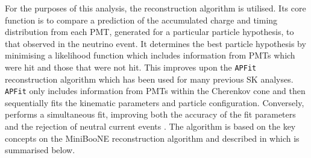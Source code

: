 For the purposes of this analysis, the \fq reconstruction algorithm is utilised. Its core function is to compare a prediction of the accumulated charge and timing distribution from each PMT, generated for a particular particle hypothesis, to that observed in the neutrino event. It determines the best particle hypothesis by minimising a likelihood function which includes information from PMTs which were hit and those that were not hit. This improves upon the \texttt{APFit} reconstruction algorithm which has been used for many previous SK analyses. \texttt{APFit} only includes information from PMTs within the \quickmath{43\deg} Cherenkov cone and then sequentially fits the kinematic parameters and particle configuration. Conversely, \fq performs a simultaneous fit, improving both the accuracy of the fit parameters and the rejection of neutral current  events \cite{Abe2018, Abe2015}. The \fq algorithm is based on the key concepts on the MiniBooNE reconstruction algorithm \cite{Patterson_2009} and described in \cite{t2k_tn_146} which is summarised below.

